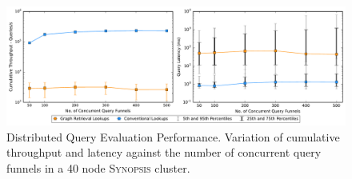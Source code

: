 \begin{figure}
    \centerline{\includegraphics[width=\linewidth]{figures/query_benchmark_both.pdf}}
    \caption{Distributed Query Evaluation Performance. Variation of cumulative throughput and latency against the number of concurrent query funnels in a 40 node \textsc{Synopsis} cluster.}
    \label{fig:dist-query}
\end{figure}




